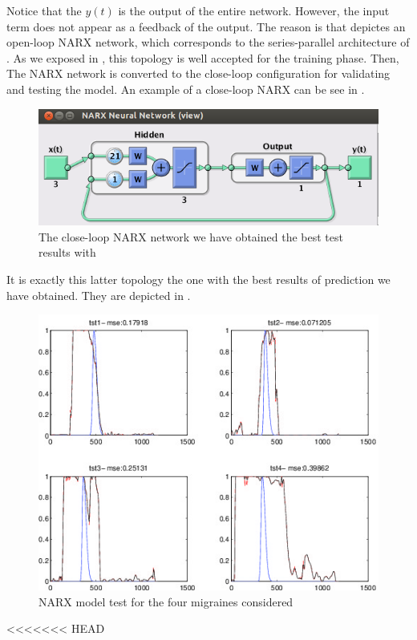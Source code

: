 Notice that the $y(t)$ is the output of the entire network. 
However, the input term does not appear as a feedback of the output. 
The reason is that  depictes an open-loop NARX network, which corresponds to the series-parallel architecture of . 
As we exposed in , this topology is well accepted for the training phase. 
Then, 
The NARX network is converted to the close-loop configuration for validating and 
testing the model. An example of a close-loop NARX can be see in .
\begin{figure}[!ht]
\centering
\includegraphics[width=0.9\columnwidth]{images/results/narxCloseloop}
\caption{The close-loop NARX network we have obtained the best test results with}
\label{fig:narxcloseloop}
\end{figure}

It is exactly this latter topology the one with the best results of prediction we have obtained. They are depicted in .
\begin{figure}
\centering
\includegraphics[width=\columnwidth]{images/results/trn3_na-nb1-nk20_NN3}
\caption{NARX model test for the four migraines considered}
\label{fig:narxTest}
\end{figure}
<<<<<<< HEAD

